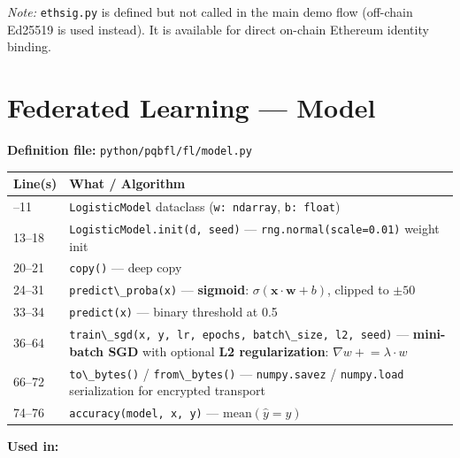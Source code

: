 \documentclass[11pt,a4paper]{article}
\newcommand{\code}[1]{\lstinline[basicstyle=\ttfamily\small]!#1!}
\begin{document}
\textit{Note:} \code{ethsig.py} is defined but not called in the main demo flow (off-chain Ed25519 is used instead). It is available for direct on-chain Ethereum identity binding.

\section{Federated Learning --- Model}

\textbf{Definition file:} \code{python/pqbfl/fl/model.py}

\begin{longtable}{L{2.2cm} L{11.5cm}}
\toprule
\textbf{Line(s)} & \textbf{What / Algorithm} \\
\midrule
\endhead
\bottomrule
{}--11   & \code{LogisticModel} dataclass (\code{w: ndarray}, \code{b: float}) \\
13--18  & \code{LogisticModel.init(d, seed)} --- \code{rng.normal(scale=0.01)} weight init \\
20--21  & \code{copy()} --- deep copy \\
24--31  & \code{predict\_proba(x)} --- \textbf{sigmoid}: $\sigma(\mathbf{x} \cdot \mathbf{w} + b)$, clipped to $\pm 50$ \\
33--34  & \code{predict(x)} --- binary threshold at 0.5 \\
36--64  & \code{train\_sgd(x, y, lr, epochs, batch\_size, l2, seed)} --- \textbf{mini-batch SGD} with optional \textbf{L2 regularization}: $\nabla w \mathrel{+}= \lambda \cdot w$ \\
66--72  & \code{to\_bytes()} / \code{from\_bytes()} --- \code{numpy.savez} / \code{numpy.load} serialization for encrypted transport \\
74--76  & \code{accuracy(model, x, y)} --- $\text{mean}(\hat{y} = y)$ \\
\end{longtable}

\textbf{Used in:}
\end{document}
